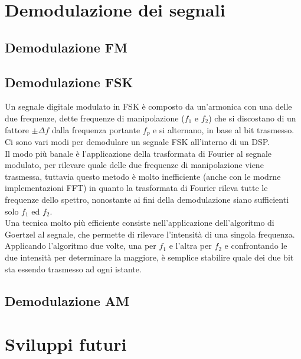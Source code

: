 \documentclass{article}
\begin{document}
\section{Demodulazione dei segnali}

\subsection{Demodulazione FM}
\subsection{Demodulazione FSK}
Un segnale digitale modulato in FSK è composto da un'armonica con una delle due frequenze, dette frequenze di manipolazione
($f_1$ e $f_2$) che si discostano di un fattore $\pm \Delta f$ dalla frequenza portante $f_p$ e si alternano, in base al bit
trasmesso. Ci sono vari modi per demodulare un segnale FSK all'interno di un DSP.\\
Il modo più banale è l'applicazione della trasformata di Fourier al segnale modulato, per rilevare quale delle due frequenze
di manipolazione viene trasmessa, tuttavia questo metodo è molto inefficiente (anche con le modrne implementazioni FFT) in quanto
la trasformata di Fourier rileva tutte le frequenze dello spettro, nonostante ai fini della demodulazione siano sufficienti
solo $f_1$ ed $f_2$.\\
Una tecnica molto più efficiente consiste nell'applicazione dell'algoritmo di Goertzel al segnale, che permette di rilevare
l'intensità di una singola frequenza. Applicando l'algoritmo due volte, una per $f_1$ e l'altra per $f_2$ e confrontando le due
intensità per determinare la maggiore, è semplice stabilire quale dei due bit sta essendo trasmesso ad ogni istante.

\subsection{Demodulazione AM}




\section{Sviluppi futuri}
\end{document}
